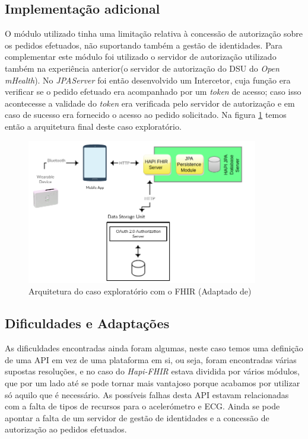 \subsection{Implementação adicional}
O módulo utilizado tinha uma limitação relativa à concessão de autorização sobre os pedidos efetuados, não suportando também a gestão de identidades. Para complementar este módulo foi utilizado o servidor de autorização utilizado também na experiência anterior(o servidor de autorização do \gls{DSU} do \textit{Open mHealth}).
No \textit{JPAServer} foi então desenvolvido um Intercetor, cuja função era verificar se o pedido efetuado era acompanhado por um \textit{token} de acesso; caso isso acontecesse a validade do \textit{token} era verificada pelo servidor de autorização e em caso de sucesso era fornecido o acesso ao pedido solicitado. Na figura \ref{f:exp-fhir-arch} temos então a arquitetura final deste caso exploratório.
\newpage
\begin{figure}[H]
  \centering
  \includegraphics[width=0.9\textwidth]{imgs/fhir-arch-exp.png}
  \caption[Arquitetura do caso exploratório com o FHIR]{Arquitetura do caso exploratório com o FHIR (Adaptado de)\cite{hapi-index}}
  
  \label{f:exp-fhir-arch}
\end{figure}

\subsection{Dificuldades e Adaptações}
As dificuldades encontradas ainda foram algumas, neste caso temos uma definição de uma \gls{API} em vez de uma plataforma em si, ou seja, foram encontradas várias supostas resoluções, e no caso do \textit{Hapi-FHIR} estava dividida por vários módulos, que por um lado até se pode tornar mais vantajoso porque acabamos por utilizar só aquilo que é necessário. As possíveis falhas desta \gls{API} estavam relacionadas com a falta de tipos de recursos para o acelerómetro e \gls{ECG}. Ainda se pode apontar a falta de um servidor de gestão de identidades e a concessão de autorização ao pedidos efetuados.

